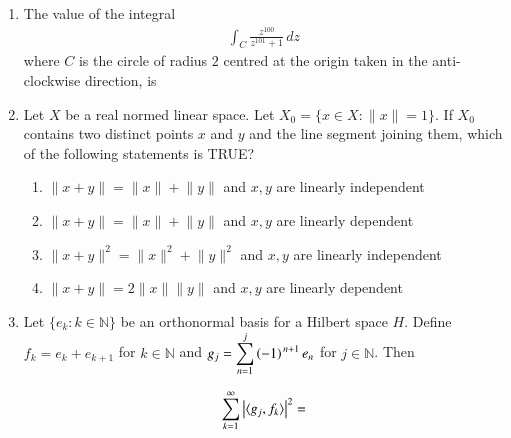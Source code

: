 \documentclass[journal,12pt,onecolumn]{IEEEtran}
\theoremstyle{remark}
\begin{document}
\begin{enumerate}
\item The value of the integral
\begin{align*}
\int_{C} \frac{z^{100}}{z^{101}+1}\,dz
\end{align*}
where $C$ is the circle of radius $2$ centred at the origin taken in the anti-clockwise direction, is

\hfill{}

\begin{enumerate}
\end{enumerate}

\item Let $X$ be a real normed linear space. Let $X_{0} = \{x \in X \colon \lVert x \rVert = 1\}$. If $X_{0}$ contains two distinct points $x$ and $y$ and the line segment joining them, which of the following statements is TRUE?

\hfill{}

\begin{enumerate}
\item $\lVert x + y \rVert = \lVert x \rVert + \lVert y \rVert$ and $x, y$ are linearly independent
\item $\lVert x + y \rVert = \lVert x \rVert + \lVert y \rVert$ and $x, y$ are linearly dependent
\item $\lVert x + y \rVert^{2} = \lVert x \rVert^{2} + \lVert y \rVert^{2}$ and $x, y$ are linearly independent
\item $\lVert x + y \rVert = 2 \lVert x \rVert \lVert y \rVert$ and $x, y$ are linearly dependent
\end{enumerate}

\item Let $\{e_{k} \colon k \in \mathbb{N}\}$ be an orthonormal basis for a Hilbert space $H$. Define $f_{k}=e_{k}+e_{k+1}$ for $k \in \mathbb{N}$ and $g_{j}=\displaystyle\sum\limits_{n=1}^{j}\left(-1\right)^{\,n+1}e_{n}$ for $j \in \mathbb{N}$. Then

\begin{align*}
\sum\limits_{k=1}^{\infty}\left\vert\langle g_{j},f_{k}\rangle\right\vert^{2}= 
\end{align*}


\end{enumerate}
\end{document}

